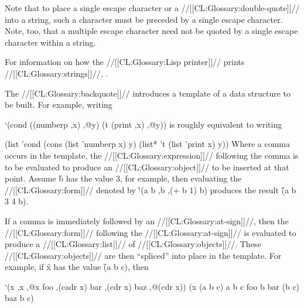 
Note that to place a single escape character or a //[[CL:Glossary:double-quote]]// into a string, such a character must be preceded by a single escape character. Note, too, that a multiple escape character need not be quoted by a  single escape character within a string.

For information on how the //[[CL:Glossary:Lisp printer]]// prints //[[CL:Glossary:strings]]//, \seesection\PrintingStrings.

\endsubsection%

   

The //[[CL:Glossary:backquote]]// introduces a template of a data structure to be built.   For example, writing

\code
 `(cond ((numberp ,x) ,@y) (t (print ,x) ,@y)) \endcode is roughly equivalent to writing

\code
 (list 'cond 
       (cons (list 'numberp x) y) 
       (list* 't (list 'print x) y)) \endcode Where a comma occurs in the template,  the //[[CL:Glossary:expression]]// following the comma is to be evaluated to produce an //[[CL:Glossary:object]]// to be inserted at that point.  Assume \f{b} has the value 3, for example, then evaluating the //[[CL:Glossary:form]]// denoted by \f{`(a b ,b ,(+ b 1) b)} produces the result \f{(a b 3 4 b)}.

If a comma is immediately followed by an //[[CL:Glossary:at-sign]]//,  then the //[[CL:Glossary:form]]// following the //[[CL:Glossary:at-sign]]// is evaluated to produce a //[[CL:Glossary:list]]// of //[[CL:Glossary:objects]]//. These //[[CL:Glossary:objects]]// are then ``spliced'' into place in the template.  For example, if \f{x} has the value \f{(a b c)}, then

\code
 `(x ,x ,@x foo ,(cadr x) bar ,(cdr x) baz ,@(cdr x)) \EV (x (a b c) a b c foo b bar (b c) baz b c) \endcode

